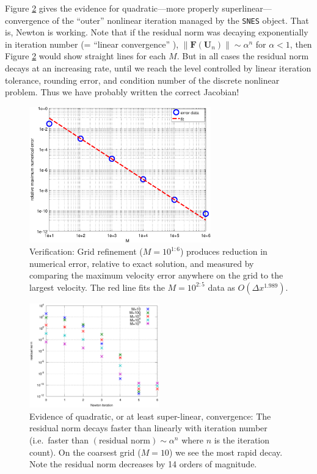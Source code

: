 \documentclass[11pt,final,reqno]{amsart}
\newcommand{\bbF}{\mathbf{F}}
\newcommand{\bU}{\mathbf{U}}
\begin{document}
Figure \ref{fig:quadconv} gives the evidence for quadratic---more properly superlinear---convergence of the ``outer'' nonlinear iteration managed by the \texttt{SNES} object.  That is, Newton is working.  Note that if the residual norm was decaying exponentially in iteration number (= ``linear convergence'' \cite{BurdenFaires}), $\|\bbF(\bU_n)\| \sim \alpha^n$ for $\alpha < 1$, then Figure \ref{fig:quadconv} would show straight lines for each $M$.  But in all cases the residual norm decays at an increasing rate, until we reach the level controlled by linear iteration tolerance, rounding error, and condition number of the discrete nonlinear problem.  Thus we have probably written the correct Jacobian!

\begin{figure}[ht] 
\begin{center}
\includegraphics[width=0.7\textwidth]{numerr}
\end{center}
\caption{Verification:  Grid refinement ($M=10^{1:6}$) produces reduction in numerical error, relative to exact solution, and measured by comparing the maximum velocity error anywhere on the grid to the largest velocity.  The red line fits the $M=10^{2:5}$ data as $O(\Delta x^{1.989})$.}
\label{fig:numerr}
\end{figure}

\begin{figure}[ht] 
\begin{center}
\includegraphics[width=0.5\textwidth]{quadconv}
\end{center}
\caption{Evidence of quadratic, or at least super-linear, convergence:  The residual norm decays faster than linearly with iteration number (i.e.~faster than $(\text{residual norm})\sim \alpha^n$ where $n$ is the iteration count).  On the coarsest grid ($M=10$) we see the most rapid decay.  Note the residual norm decreases by 14 orders of magnitude.}
\label{fig:quadconv}
\end{figure}
\end{document}
